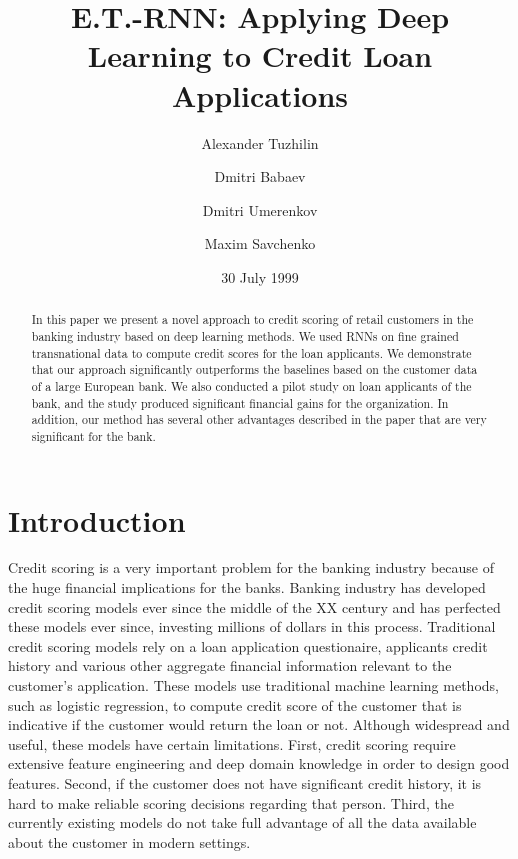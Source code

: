\documentclass[sigconf]{acmart}
\begin{document}
\title{E.T.-RNN: Applying Deep Learning to Credit Loan Applications}

\author{Alexander Tuzhilin}

\author{Dmitri Babaev}
\affiliation{
  \institution{}
}

\author{Dmitri Umerenkov}
\affiliation{
  \institution{}
}

\author{Maxim Savchenko}
\affiliation{
  \institution{}
}

\date{30 July 1999}

\begin{abstract}
In this paper we present a novel approach to credit scoring of retail customers in the banking industry based on deep learning methods. We used RNNs on fine grained transnational data to compute credit scores for the loan applicants. We demonstrate that our approach significantly outperforms the baselines based on the customer data of a large European bank. We also conducted a pilot study on loan applicants of the bank, and the study produced significant financial gains for the organization.
In addition, our method has several other advantages described in the paper that are very significant for the bank.
\end{abstract}

\maketitle

\section{Introduction}

Credit scoring is a very important problem for the banking industry because of the huge financial implications for the banks. Banking industry has developed credit scoring models ever since the middle of the XX century  and has perfected these models ever since, investing millions of dollars in this process. Traditional credit scoring models rely on a loan application questionaire, applicants credit history and various other aggregate financial information relevant to the customer's application. These models use traditional machine learning methods, such as logistic regression, to compute credit score of the customer that is indicative if the customer would return the loan or not. Although widespread and useful, these models have certain limitations. First, credit scoring require extensive feature engineering and deep domain knowledge in order to design good features.
Second, if the customer does not have significant credit history, it is hard to make reliable scoring decisions regarding that person. Third, the currently existing models do not take full advantage of all the data available about the customer in modern settings.
\end{document}

